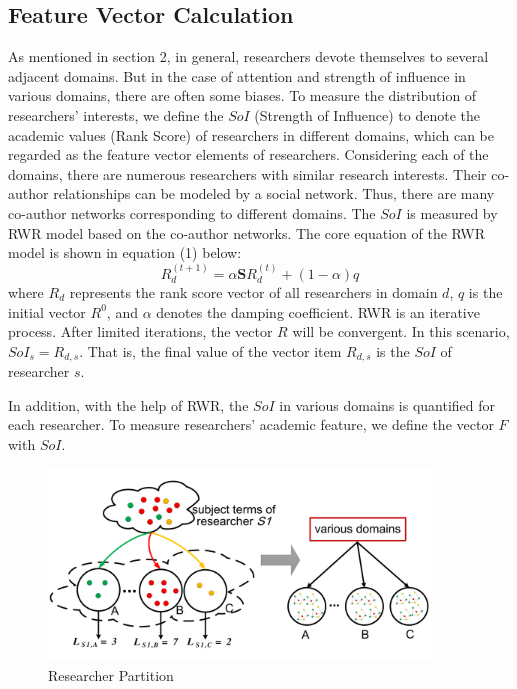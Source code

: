 \documentclass[review]{elsarticle}
\begin{document}
\subsection{Feature Vector Calculation}
As mentioned in section 2, in general, researchers devote themselves to several adjacent domains. But in the case of attention and strength of influence in various domains, there are often some biases. To measure the distribution of researchers' interests, we define the $SoI$ (Strength of Influence) to denote the academic values (Rank Score) of researchers in different domains, which can be regarded as the feature vector elements of researchers. Considering each of the domains, there are numerous researchers with similar research interests. Their co-author relationships can be modeled by a social network. Thus, there are many co-author networks corresponding to different domains. The $SoI$ is measured by RWR model based on the co-author networks. The core equation of the RWR model is shown in equation (1) below:
\begin{equation}
R_{d}^{(t+1)}=\alpha \mathbf{S}R_{d}^{(t)}+(1-\alpha)q
\end{equation}
where $R_{d}$ represents the rank score vector of all researchers in domain $d$, $q$ is the initial vector $R^0$, and $\alpha$ denotes the damping coefficient. RWR is an iterative process. After limited iterations, the vector $R$ will be convergent. In this scenario, $SoI_{s}=R_{d,s}$. That is, the final value of the vector item $R_{d,s}$ is the $SoI$ of researcher $s$.


In addition, with the help of RWR, the $SoI$ in various domains is quantified for each researcher. To measure researchers' academic feature, we define the vector $F$ with $SoI$.

\begin{figure}
\centering
\includegraphics [width=4in]{Fig5.pdf}
\caption{Researcher Partition}
\end{figure}
\end{document}
